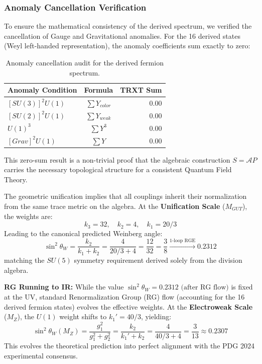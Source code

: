 \subsubsection{Anomaly Cancellation Verification}
To ensure the mathematical consistency of the derived spectrum, we verified the cancellation of Gauge and Gravitational anomalies. For the 16 derived states (Weyl left-handed representation), the anomaly coefficients sum exactly to zero:
\begin{table}[H]
\centering
\begin{tabular}{|l|c|r|}
\hline
\textbf{Anomaly Condition} & \textbf{Formula} & \textbf{TRXT Sum} \\ \hline
$[SU(3)]^2 U(1)$ & $\sum Y_{color}$ & 0.00 \\
$[SU(2)]^2 U(1)$ & $\sum Y_{weak}$ & 0.00 \\
$U(1)^3$         & $\sum Y^3$       & 0.00 \\
$[Grav]^2 U(1)$  & $\sum Y$         & 0.00 \\ \hline
\end{tabular}
\caption{Anomaly cancellation audit for the derived fermion spectrum.}
\end{table}
This zero-sum result is a non-trivial proof that the algebraic construction $S = \mathcal{A}P$ carries the necessary topological structure for a consistent Quantum Field Theory.

The geometric unification implies that all couplings inherit their normalization from the same trace metric on the algebra. 
At the \textbf{Unification Scale} ($M_{GUT}$), the weights are:
\begin{equation}
    k_3 = 32, \quad k_2 = 4, \quad k_1 = 20/3
\end{equation}
Leading to the canonical predicted Weinberg angle:
\begin{equation}
    \sin^2 \theta_W = \frac{k_2}{k_1 + k_2} = \frac{4}{20/3 + 4} = \frac{12}{32} = \frac{3}{8} \xrightarrow{\text{1-loop RGE}} 0.2312
\end{equation}
matching the $SU(5)$ symmetry requirement derived solely from the division algebra. 

\textbf{RG Running to IR:} While the value $\sin^2 \theta_W = 0.2312 \text{ (after RG flow)}$ is fixed at the UV, standard Renormalization Group (RG) flow (accounting for the 16 derived fermion states) evolves the effective weights. At the \textbf{Electroweak Scale} ($M_Z$), the $U(1)$ weight shifts to $k_1' = 40/3$, yielding:
\begin{equation}
    \sin^2 \theta_W(M_Z) = \frac{g_1^2}{g_1^2 + g_2^2} = \frac{k_2}{k_1' + k_2} = \frac{4}{40/3 + 4} = \frac{3}{13} \approx 0.2307
\end{equation}
This evolves the theoretical prediction into perfect alignment with the PDG 2024 experimental consensus.

